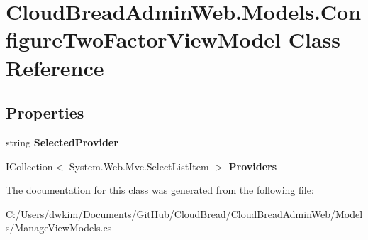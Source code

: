 \hypertarget{class_cloud_bread_admin_web_1_1_models_1_1_configure_two_factor_view_model}{}\section{Cloud\+Bread\+Admin\+Web.\+Models.\+Configure\+Two\+Factor\+View\+Model Class Reference}
\label{class_cloud_bread_admin_web_1_1_models_1_1_configure_two_factor_view_model}
\subsection*{Properties}
\begin{DoxyCompactItemize}
\item 
string {\bfseries Selected\+Provider}\hypertarget{class_cloud_bread_admin_web_1_1_models_1_1_configure_two_factor_view_model_a32ecc646507d84893d1252bc4815ea74}{}\label{class_cloud_bread_admin_web_1_1_models_1_1_configure_two_factor_view_model_a32ecc646507d84893d1252bc4815ea74}

\item 
I\+Collection$<$ System.\+Web.\+Mvc.\+Select\+List\+Item $>$ {\bfseries Providers}\hypertarget{class_cloud_bread_admin_web_1_1_models_1_1_configure_two_factor_view_model_a25fb49647e4a89957c7809a4b1d555aa}{}\label{class_cloud_bread_admin_web_1_1_models_1_1_configure_two_factor_view_model_a25fb49647e4a89957c7809a4b1d555aa}

\end{DoxyCompactItemize}


The documentation for this class was generated from the following file\+:\begin{DoxyCompactItemize}
\item 
C\+:/\+Users/dwkim/\+Documents/\+Git\+Hub/\+Cloud\+Bread/\+Cloud\+Bread\+Admin\+Web/\+Models/Manage\+View\+Models.\+cs\end{DoxyCompactItemize}
